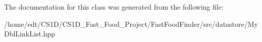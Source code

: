The documentation for this class was generated from the following file\-:\begin{DoxyCompactItemize}
\item 
/home/edt/\-C\-S1\-D/\-C\-S1\-D\-\_\-\-Fast\-\_\-\-Food\-\_\-\-Project/\-Fast\-Food\-Finder/src/datastore/My\-Dbl\-Link\-List.\-hpp\end{DoxyCompactItemize}

